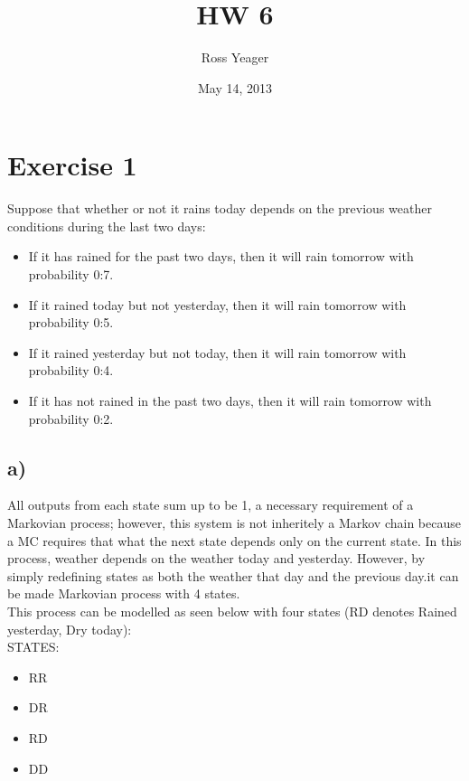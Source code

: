 \documentclass[10pt]{article}
\title{HW 6}
\author{Ross Yeager}
\date{May 14, 2013}
\begin{document}
\setlength\parindent{0pt}
\maketitle




\section*{Exercise 1}


Suppose that whether or not it rains today depends on the previous weather conditions during
the last two days:\\

\begin{itemize}
\item If it has rained for the past two days, then it will rain tomorrow with probability 0:7.
\item If it rained today but not yesterday, then it will rain tomorrow with probability 0:5.
\item If it rained yesterday but not today, then it will rain tomorrow with probability 0:4.
\item If it has not rained in the past two days, then it will rain tomorrow with probability 0:2.
\end{itemize}


\subsection*{a)}

All outputs from each state sum up to be 1, a necessary requirement of a Markovian process; 
however, this system is not inheritely a Markov chain because a MC requires that what the next state depends only on the current state.  
In this process, weather depends on the weather today and yesterday. 
However, by simply redefining states as both the weather that day and the previous day.it can be made Markovian process with 4 states.\\

This process can be modelled as seen below with four states (RD denotes Rained yesterday, Dry today):\\
STATES:
\begin{itemize}
\item RR
\item DR
\item RD
\item DD
\end{itemize}
\end{document}
